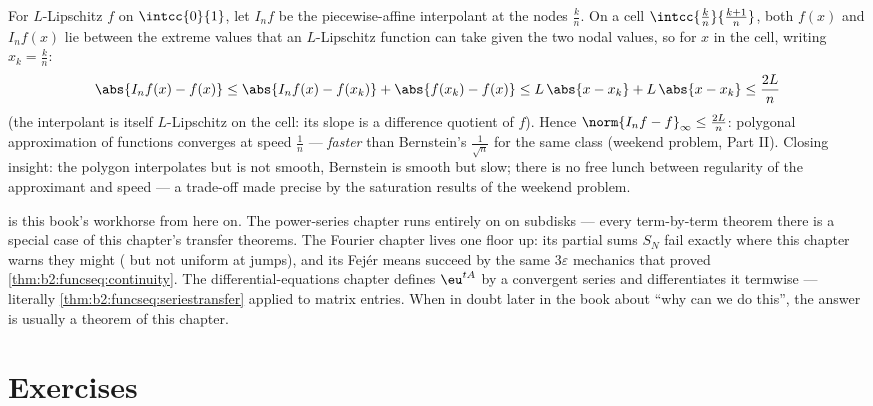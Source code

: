 \begin{example}\label{ex:b2:funcseq:polygonal}
For $L$-Lipschitz $f$ on $\intcc{0}{1}$, let $I_nf$ be the
piecewise-affine interpolant at the nodes $\frac kn$. On a
cell $\intcc{\frac kn}{\frac{k+1}n}$, both $f(x)$ and
$I_nf(x)$ lie between the extreme values that an $L$-Lipschitz
function can take given the two nodal values, so for $x$ in
the cell, writing $x_k = \frac kn$:
\[
\abs{I_nf(x) - f(x)}
\leq \abs{I_nf(x) - f(x_k)} + \abs{f(x_k) - f(x)}
\leq L\,\abs{x - x_k} + L\,\abs{x - x_k}
\leq \frac{2L}{n}
\]
(the interpolant is itself $L$-Lipschitz on the cell: its
slope is a difference quotient of $f$). Hence $\norm{I_nf -
f}_\infty \leq \frac{2L}{n}$: polygonal approximation of
 functions converges at speed $\frac1n$ ---
\emph{faster} than Bernstein's $\frac{1}{\sqrt n}$ for the
same class (weekend problem, Part II). Closing insight: the
polygon interpolates but is not smooth, Bernstein is smooth
but slow; there is no free lunch between regularity of the
approximant and speed --- a trade-off made precise by the
saturation results of the weekend problem.
\end{example}

\begin{remark}
 is this book's workhorse from here on. The
power-series chapter runs entirely on  on
 subdisks --- every term-by-term theorem there is a
special case of this chapter's transfer theorems. The Fourier
chapter lives one floor up: its partial sums $S_N$ fail
exactly where this chapter warns they might ( but not
uniform at jumps), and its Fej\'er means succeed by the same
$3\varepsilon$ mechanics that proved
\cref{thm:b2:funcseq:continuity}. The differential-equations
chapter defines $\eu^{tA}$ by a  convergent series and
differentiates it termwise --- literally
\cref{thm:b2:funcseq:seriestransfer} applied to matrix
entries. When in doubt later in the book about ``why can we
do this'', the answer is usually a theorem of this chapter.
\end{remark}

\section{Exercises}

